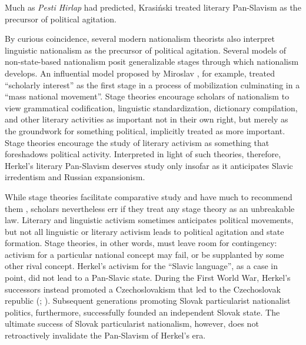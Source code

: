 \noindent Much as \textit{Pesti Hirlap} had predicted, Krasiński treated literary Pan-Slavism as the precursor of political agitation.

\largerpage
By curious coincidence, several modern nationalism theorists also interpret linguistic nationalism as the precursor of political agitation. Several models of non-state-based nationalism posit generalizable stages through which nationalism develops. An influential model proposed by Miroslav \citet[26]{hroch_social_1985}, for example, treated “scholarly interest” as the first stage in a process of mobilization culminating in a “mass national movement”. Stage theories encourage scholars of nationalism to view grammatical codification, linguistic standardization, dictionary compilation, and other literary activities as important not in their own right, but merely as the groundwork for something political, implicitly treated as more important. Stage theories encourage the study of literary activism as something that foreshadows political activity. Interpreted in light of such theories, therefore, Herkel’s literary Pan-Slavism deserves study only insofar as it anticipates Slavic irredentism and Russian expansionism.

While stage theories facilitate comparative study and have much to recommend them \citep{maxwell_comparative_2012}, scholars nevertheless err if they treat any stage theory as an unbreakable law. Literary and linguistic activism sometimes anticipates political movements, but not all linguistic or literary activism leads to political agitation and state formation. Stage theories, in other words, must leave room for contingency: activism for a particular national concept may fail, or be supplanted by some other rival concept. Herkel’s activism for the “Slavic language”, as a case in point, did not lead to a Pan-Slavic state. During the First World War, Herkel’s successors instead promoted a Czechoslovakism that led to the Czechoslovak republic (\cite{locher_nationale_1931}; \cite{maxwell_choosing_2009}). Subsequent generations promoting Slovak particularist nationalist politics, furthermore, successfully founded an independent Slovak state. The ultimate success of Slovak particularist nationalism, however, does not retroactively invalidate the Pan-Slavism of Herkel’s era.

